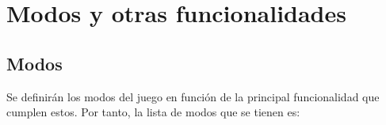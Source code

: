 \section{Modos y otras funcionalidades} %


\subsection{Modos}
Se definirán los modos del juego en función de la principal funcionalidad que
cumplen estos. Por tanto, la lista de modos que se tienen es:

